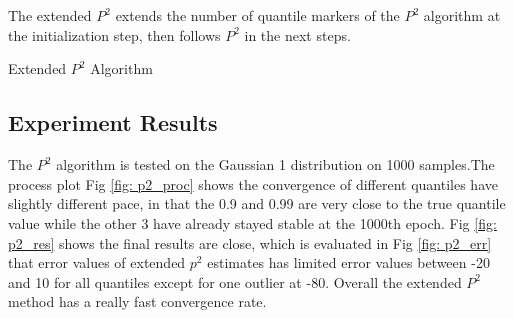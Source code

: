 \begin{algorithm}
\begin{algorithmic}[1]
            \State
        \end{algorithmic}
\end{algorithm}
\\\\
The extended $P^2$ extends the number of quantile markers of the $P^2$ algorithm at the initialization step, then follows $P^2$ in the next steps.

\begin{algorithm}
    \caption{Extended $P^2$ Algorithm}\label{alg:multi_ext_p2}
        \begin{algorithmic}[1]

            \State

            \State
            \State
        \end{algorithmic}
\end{algorithm}


\subsection{Experiment Results}
\label{subsec: exp_extended_{p2}}
The $P^2$ algorithm is tested on the Gaussian 1 distribution on 1000 samples.The process plot Fig \ref{fig: p2_proc} shows the convergence of different quantiles have slightly different pace, in that the 0.9 and 0.99 are very close to the true quantile value while the other 3 have already stayed stable at the 1000th epoch. Fig \ref{fig: p2_res} shows the final results are close, which is evaluated in Fig \ref{fig: p2_err} that error values of extended $p^2$ estimates has limited error values between -20 and 10 for all quantiles except for one outlier at -80. 
Overall the extended $P^2$ method has a really fast convergence rate.

